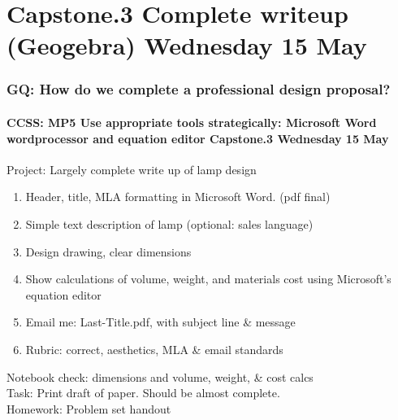 \documentclass{beamer}
\begin{document}
\section{Capstone.3 Complete writeup (Geogebra) Wednesday 15 May}
  \frame
  {
    \frametitle{GQ: How do we complete a professional design proposal?}
    \framesubtitle{CCSS: MP5 Use appropriate tools strategically: Microsoft Word wordprocessor and equation editor \hfill \alert{Capstone.3 Wednesday 15 May}}

    \begin{block}{Project: Largely complete write up of lamp design}
      \begin{enumerate}
        \item Header, title, MLA formatting in Microsoft Word. (pdf final)
        \item Simple text description of lamp (optional: sales language)
        \item Design drawing, clear dimensions
        \item Show calculations of volume, weight, and materials cost using Microsoft's equation editor
        \item Email me: Last-Title.pdf, with subject line \& message
        \item Rubric: correct, aesthetics, MLA \& email standards
      \end{enumerate}
    \end{block}
    Notebook check: dimensions and volume, weight, \& cost calcs\\
    Task: Print draft of paper. Should be almost complete.\\
    Homework: Problem set handout
  }
\end{document}
